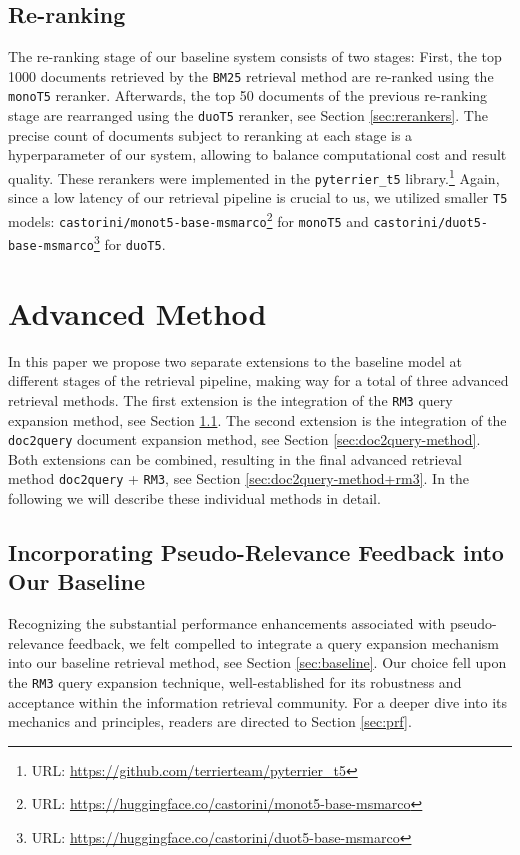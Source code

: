 \documentclass[sigconf]{acmart}
\begin{document}
\subsection{Re-ranking}
The re-ranking stage of our baseline system consists of two stages: First, the top 1000 documents retrieved by the \texttt{BM25} retrieval method are re-ranked using the \texttt{monoT5} reranker. Afterwards, the top 50 documents of the previous re-ranking stage are rearranged using the \texttt{duoT5} reranker, see Section \ref{sec:rerankers}. The precise count of documents subject to reranking at each stage is a hyperparameter of our system, allowing to balance computational cost and result quality. These rerankers were implemented in the \texttt{pyterrier\_t5} library.\footnote{URL: \url{https://github.com/terrierteam/pyterrier_t5}} Again, since a low latency of our retrieval pipeline is crucial to us, we utilized smaller \texttt{T5} models: \texttt{castorini\-/monot5\--base\--msmarco}\footnote{URL: \url{https://huggingface.co/castorini/monot5-base-msmarco}} for \texttt{monoT5} and \texttt{castorini\-/duot5\--base\--msmarco}\footnote{URL: \url{https://huggingface.co/castorini/duot5-base-msmarco}} for \texttt{duoT5}.


\section{Advanced Method}
In this paper we propose two separate extensions to the baseline model at different stages of the retrieval pipeline, making way for a total of three advanced retrieval methods. The first extension is the integration of the \texttt{RM3} query expansion method, see Section \ref{sec:baseline+rm3}. The second extension is the integration of the \texttt{doc2query} document expansion method, see Section \ref{sec:doc2query-method}. Both extensions can be combined, resulting in the final advanced retrieval method \texttt{doc2query} + \texttt{RM3}, see Section \ref{sec:doc2query-method+rm3}. In the following we will describe these individual methods in detail.

\subsection{Incorporating Pseudo-Relevance Feedback into Our Baseline}\label{sec:baseline+rm3}
Recognizing the substantial performance enhancements associated with pseudo-relevance feedback, we felt compelled to integrate a query expansion mechanism into our baseline retrieval method, see Section \ref{sec:baseline}. Our choice fell upon the \texttt{RM3} query expansion technique, well-established for its robustness and acceptance within the information retrieval community. For a deeper dive into its mechanics and principles, readers are directed to Section \ref{sec:prf}.
\end{document}
